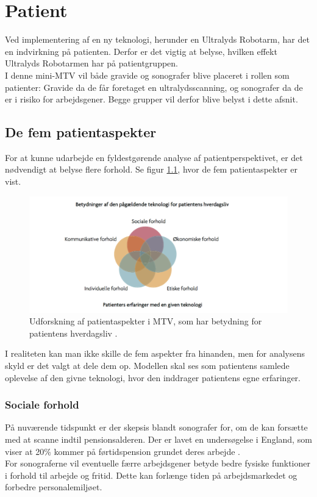 \chapter{Patient}
Ved implementering af en ny teknologi, herunder en Ultralyds Robotarm, har det en indvirkning på patienten. Derfor er det vigtig at belyse, hvilken effekt Ultralyds Robotarmen har på patientgruppen. \\
I denne mini-MTV vil både gravide og sonografer blive placeret i rollen som patienter: Gravide da de får foretaget en ultralydsscanning, og sonografer da de er i risiko for arbejdsgener. Begge grupper vil derfor blive belyst i dette afsnit.  

\section{De fem patientaspekter}
For at kunne udarbejde en fyldestgørende analyse af patientperspektivet, er det nødvendigt at belyse flere forhold. Se figur \ref{patientMTV}, hvor de fem patientaspekter er vist. 
\begin{figure}[h!]\centering
	\includegraphics[width = 1.0\textwidth]{Figurer/PatientaspekterMTV}
	\caption{Udforskning af patientaspekter i MTV, som har betydning for patientens hverdagsliv \cite{Leavitt}.}
	\label{patientMTV}
\end{figure}

I realiteten kan man ikke skille de fem aspekter fra hinanden, men for analysens skyld er det valgt at dele dem op. Modellen skal ses som patientens samlede oplevelse af den givne teknologi, hvor den inddrager patientens egne erfaringer. 

\subsection{Sociale forhold}
På nuværende tidspunkt er der skepsis blandt sonografer for, om de kan forsætte med at scanne indtil pensionsalderen. Der er lavet en undersøgelse i England, som viser at 20\% kommer på førtidspension grundet deres arbejde \cite{32}.  \\ 
For sonograferne vil eventuelle færre arbejdsgener betyde bedre fysiske funktioner i forhold til arbejde og fritid. Dette kan forlænge tiden på arbejdsmarkedet og forbedre personalemiljøet.      

